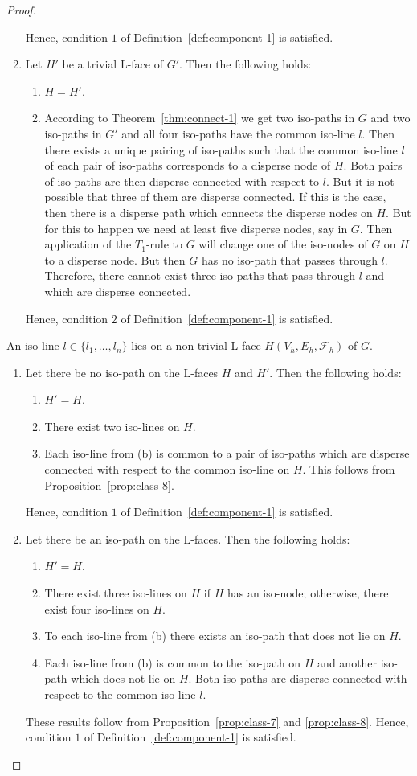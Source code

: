 \documentclass[a4paper,11pt]{article}
\begin{document}
\begin{proof}
\begin{enumerate}
Hence, condition $1$ of Definition~\ref{def:component-1} is satisfied.
\item Let $H'$ be a trivial L-face of $G'$. Then the following holds:
\begin{enumerate}
\item $H=H'$.
\item According to Theorem~\ref{thm:connect-1} we get two iso-paths in $G$ and two iso-paths in $G'$ and
all four iso-paths have the common iso-line $l$. Then there exists a unique pairing of iso-paths such that
the common iso-line $l$ of each pair of iso-paths corresponds to a disperse node of $H$. Both pairs of
iso-paths are then disperse connected with respect to $l$. But it is not possible that three of them
are disperse connected. If this is the case, then there is a disperse path which connects the disperse
nodes on $H$. But for this to happen we need at least five disperse nodes, say in $G$. Then application of
the $T_1$-rule to $G$ will change one of the iso-nodes of $G$ on $H$ to a disperse node. But then
$G$ has no iso-path that passes through $l$. Therefore, there cannot exist three iso-paths that pass
through $l$ and which are disperse connected.
\end{enumerate}
Hence, condition $2$ of Definition~\ref{def:component-1} is satisfied.
\end{enumerate}
An iso-line $l\in\{l_1,\ldots,l_n\}$ lies on a non-trivial L-face
$H(V_h,E_h,\mathcal{F}_h)$ of $G$.
\begin{enumerate}
\item Let there be no iso-path on the L-faces $H$ and $H'$. Then the following holds:
\begin{enumerate}
\item $H'=H$.
\item There exist two iso-lines on $H$.
\item Each iso-line from (b) is common to a pair of iso-paths which are disperse connected with respect to
the common iso-line on $H$. This follows from Proposition~\ref{prop:class-8}.
\end{enumerate}
Hence, condition $1$ of Definition~\ref{def:component-1} is satisfied.
\item Let there be an iso-path on the L-faces. Then the following holds:
\begin{enumerate}
\item $H'=H$.
\item There exist three iso-lines on $H$ if $H$ has an iso-node; otherwise, there exist four iso-lines on $H$.
\item To each iso-line from (b) there exists an iso-path that does not lie on $H$.
\item Each iso-line from (b) is common to the iso-path on $H$ and another iso-path which does not lie on
$H$. Both iso-paths are disperse connected with respect to the common iso-line $l$.
\end{enumerate}
These results follow from Proposition~\ref{prop:class-7} and \ref{prop:class-8}. Hence, condition $1$ of
Definition~\ref{def:component-1} is satisfied.
\end{enumerate}
\end{proof}
\end{document}

